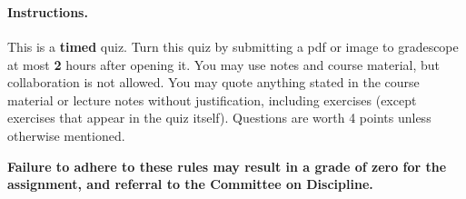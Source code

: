 \documentclass[12pt]{article}
\begin{document}

 \\
~\\

\paragraph{Instructions.} This is a {\bf timed} quiz. Turn this quiz by submitting a pdf or image to gradescope at most \textbf{2} hours after opening it. You may use notes and course material, but collaboration is not allowed. You may quote anything stated in the course material or lecture notes without justification, including exercises (except exercises that appear in the quiz itself). Questions are worth 4 points unless otherwise mentioned.

\textbf{Failure to adhere to these rules may result in a grade of zero for the assignment, and referral to the Committee on Discipline.}
\end{document}
